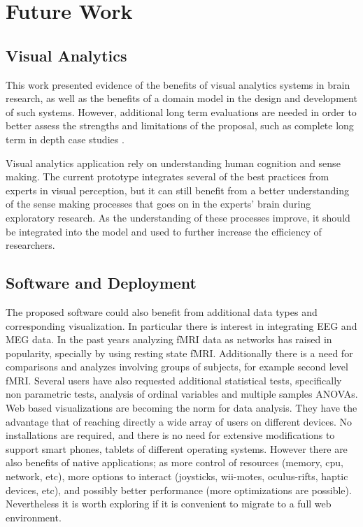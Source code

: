 \section{Future Work}

\subsection{Visual Analytics}
This work presented evidence of the benefits of visual analytics systems in brain research, as well as the benefits of a domain model in the design and development of such systems. However, additional long term evaluations are needed in order to better assess the strengths and limitations of the proposal, such as complete long term in depth case studies \autocite{shneiderman_strategies_2006}. 

Visual analytics application rely on understanding human cognition and sense making. The current prototype integrates several of the best practices from experts in visual perception, but it can still benefit from a better understanding of the sense making processes that goes on in the experts' brain during exploratory research. As the understanding of these processes improve, it should be integrated into the model and used to further increase the efficiency of researchers.


\subsection{Software and Deployment}

The proposed software could also benefit from additional data types and corresponding visualization. In particular there is interest in integrating EEG and MEG data. In the past years analyzing fMRI data as networks has raised in popularity, specially by using resting state fMRI. Additionally there is a need for comparisons and analyzes involving groups of subjects, for example second level fMRI. Several users have also requested additional statistical tests, specifically non parametric tests, analysis of ordinal variables and multiple samples ANOVAs.  
Web based visualizations are becoming the norm for data analysis. They have the advantage that of reaching directly a wide array of users on different devices. No installations are required, and there is no need for extensive modifications to support smart phones, tablets of different operating systems. However there are also benefits of native applications; as more control of resources (memory, cpu, network, etc), more options to interact (joysticks, wii-motes, oculus-rifts, haptic devices, etc), and possibly better performance (more optimizations are possible). Nevertheless it is worth exploring if it is convenient to migrate to a full web environment.

